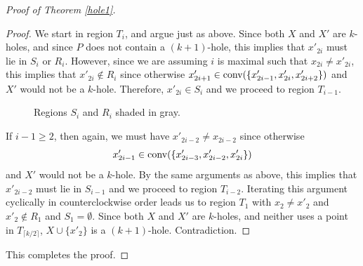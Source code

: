 \documentclass[10pt,a4paper]{amsart}
\def\conv{\mbox{\rm conv}}
\begin{document}
\begin{proof}[Proof of Theorem \ref{hole1}]
\begin{proof}
We start in region $T_i$, and argue just as above.  Since both $X$ and $X'$ are $k$-holes, and since $P$ does not contain a $(k + 1)$-hole, this implies that $x'_{2i}$ must lie in $S_i$ or $R_i$.  However, since we are assuming $i$ is maximal such that $x_{2i} \neq x'_{2i}$, this implies that $x'_{2i} \notin R_i$ since otherwise $x'_{2i + 1} \in \conv(\{x'_{2i - 1},x'_{2i},x'_{2i + 2}\})$ and $X'$ would not be a $k$-hole.  Therefore, $x'_{2i} \in S_i$ and we proceed to region $T_{i - 1}$.   

  

    \begin{figure}
        \centering
        
        \caption{Regions $S_i$ and $R_i$ shaded in gray.}
        \label{fig:es1}
    \end{figure}

If $i - 1 \geq 2$, then again, we must have $x'_{2i - 2} \neq x_{2i - 2}$ since otherwise $$x'_{2i - 1} \in \conv(\{x'_{2i - 3},x'_{2i-2},x'_{2i}\})$$ and $X'$ would not be a $k$-hole.  By the same arguments as above, this implies that $x'_{2i - 2}$ must lie in $S_{i - 1}$ and we proceed to region $T_{i - 2}$.  Iterating this argument cyclically in counterclockwise order leads us to region $T_1$ with $x_2 \neq x'_2$ and $x'_2 \not\in R_1$ and $S_1  = \emptyset$.  Since both $X$ and $X'$ are $k$-holes, and neither uses a point in $T_{\lceil k/2\rceil}$, $X\cup \{x'_2\}$ is a $(k + 1)$-hole.  Contradiction.\end{proof}



This completes the proof.\end{proof}
\end{document}
